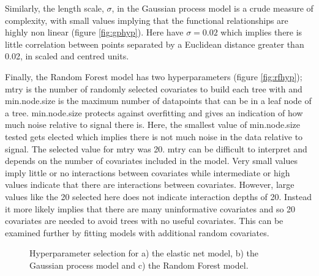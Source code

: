 \documentclass[10pt,]{article}
\begin{document}
Similarly, the length scale, \(\sigma\), in the Gaussian process model is a crude measure of complexity, with small values implying that the functional relationships are highly non linear (figure \ref{fig:gphyp}).
Here have \(\sigma = 0.02\) which implies there is little correlation between points separated by a Euclidean distance greater than 0.02, in scaled and centred units.

Finally, the Random Forest model has two hyperparameters (figure \ref{fig:rfhyp}); mtry is the number of randomly selected covariates to build each tree with and min.node.size is the maximum number of datapoints that can be in a leaf node of a tree.
min.node.size protects against overfitting and gives an indication of how much noise relative to signal there is.
Here, the smallest value of min.node.size tested gets elected which implies there is not much noise in the data relative to signal.
The selected value for mtry was 20.
mtry can be difficult to interpret and depends on the number of covariates included in the model.
Very small values imply little or no interactions between covariates while intermediate or high values indicate that there are interactions between covariates.
However, large values like the 20 selected here does not indicate interaction depths of 20.
Instead it more likely implies that there are many uninformative covariates and so 20 covariates are needed to avoid trees with no useful covariates.
This can be examined further by fitting models with additional random covariates.


\begin{figure}[t!]
  \centering

  \label{fig:hyp}
  \caption{
    Hyperparameter selection for a) the elastic net model, b) the Gaussian process model and c) the Random Forest model.
  }
\end{figure}


\end{document}
